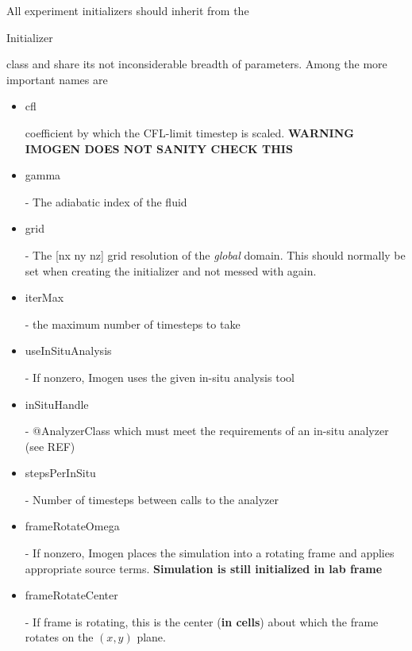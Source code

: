 \documentclass[letterpaper,12pt]{article}
\begin{document}
All experiment initializers should inherit from the \begin{tt}Initializer\end{tt} class
and share its not inconsiderable breadth of parameters. Among the more important 
names are
\begin{itemize}
\item \begin{tt}cfl\end{tt} coefficient by which the CFL-limit timestep is scaled. \textbf{WARNING
IMOGEN DOES NOT SANITY CHECK THIS}
\item \begin{tt}gamma\end{tt} - The adiabatic index of the fluid
\item \begin{tt}grid\end{tt} - The [nx ny nz] grid resolution of the \textit{global} domain. This
should normally be set when creating the initializer and not messed with again.
\item \begin{tt}iterMax\end{tt} - the maximum number of timesteps to take
\item \begin{tt}useInSituAnalysis\end{tt} - If nonzero, Imogen uses the given in-situ analysis tool
\item \begin{tt}inSituHandle\end{tt} - @AnalyzerClass which must meet the requirements of an
in-situ analyzer (see REF)
\item \begin{tt}stepsPerInSitu\end{tt} - Number of timesteps between calls to the analyzer
\item \begin{tt}frameRotateOmega\end{tt} - If nonzero, Imogen places the simulation into a rotating
frame and applies appropriate source terms. \textbf{Simulation is still initialized in lab frame}
\item \begin{tt}frameRotateCenter\end{tt} - If frame is rotating, this is the center (\textbf{in cells})
about which the frame rotates on the $(x,y)$ plane.
\end{itemize}
\end{document}
